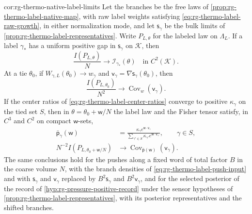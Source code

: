 {cor:rg-thermo-native-label-limits}
Let the branches be the free laws of \cref{prop:rg-thermo-label-native-map},
with raw label weights satisfying \cref{eq:rg-thermo-label-raw-growth}, in
either normalization mode, and let $\mathsf s_\gamma$ be the bulk limits of
\cref{prop:rg-thermo-label-representatives}. Write $P_{L,\theta}$ for the
labeled law on $\Lambda_L$.
If a label $\gamma_*$ has a uniform positive gap in $\mathsf s_\gamma$ on
$\mathcal K$, then
\begin{equation}
 \frac{I(P_{L,\theta})}{N}\longrightarrow\mathcal I_{\gamma_*}(\theta)
 \quad\text{in }C^2(\mathcal K).
 \label{eq:rg-thermo-draft-strict-density}
\end{equation}
At a tie $\theta_0$, if $W_{\gamma,L}(\theta_0)\to w_\gamma$ and
$\mathsf v_\gamma=\nabla\mathsf s_\gamma(\theta_0)$, then
\begin{equation}
 \frac{I(P_{L,\theta_0})}{N^2}
 \longrightarrow \operatorname{Cov}_{w}(\mathsf v_\gamma).
 \label{eq:rg-thermo-draft-tie-density}
\end{equation}
If the center ratios of \cref{eq:rg-thermo-label-center-ratios} converge to
positive $\kappa_\gamma$ on the tied set $S$, then in
$\theta=\theta_0+\mathsf w/N$ the label law and the Fisher tensor satisfy,
in $C^3$ and $C^2$ on compact $\mathsf w$-sets,
\begin{align}
 \bar{\mathsf p}_\gamma(\mathsf w)
 &=\frac{\kappa_\gamma e^{\mathsf w\cdot\mathsf v_\gamma}}
         {\sum_{\gamma'\in S}\kappa_{\gamma'}e^{\mathsf w\cdot\mathsf v_{\gamma'}}},
 \qquad \gamma\in S,
 \label{eq:rg-thermo-draft-window-weights}\\
 N^{-2}I(P_{L,\theta_0+\mathsf w/N})
 &\longrightarrow\operatorname{Cov}_{\bar{\mathsf p}(\mathsf w)}(\mathsf v_\gamma).
 \label{eq:rg-thermo-draft-window-metric}
\end{align}
The same conclusions hold for the pushes along a fixed word of total factor
$B$ in the coarse volume $N$, with the branch densities of
\cref{eq:rg-thermo-label-push-input} and with $\mathsf s_\gamma$ and
$\mathsf v_\gamma$ replaced by $B^2\mathsf s_\gamma$ and $B^2\mathsf v_\gamma$,
and for the selected posterior of the record of
\cref{hyp:rg-pressure-positive-record} under the sensor hypotheses of
\cref{prop:rg-thermo-label-representatives}, with its posterior
representatives and the shifted branches.

